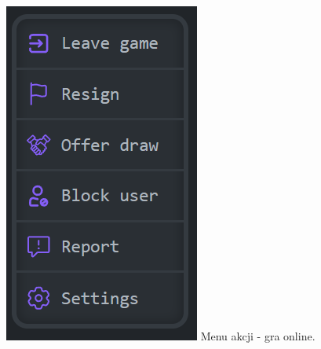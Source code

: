 \documentclass[12pt,a4paper]{article}
\begin{document}
\begin{minipage}[t]{0.2\textwidth} 
    \vspace{0pt} 
    \centering 
    \includegraphics[width=\linewidth]{images/ins_min_wopt.png} 
    Menu akcji - gra online.
\end{minipage} 
\hfill 
\end{document}
